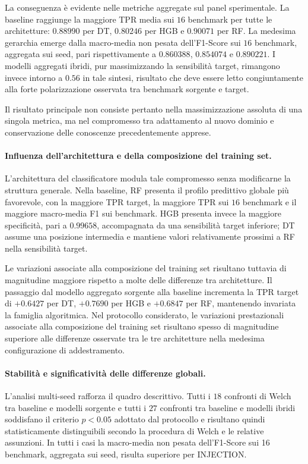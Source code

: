 La conseguenza è evidente nelle metriche aggregate sul panel sperimentale. 
La baseline raggiunge la maggiore TPR media sui $16$ benchmark per tutte le architetture: $0.88990$ per DT, $0.80246$ per HGB e $0.90071$ per RF. 
La medesima gerarchia emerge dalla macro-media non pesata dell'F1-Score sui $16$ benchmark, aggregata sui seed, pari rispettivamente a $0.860388$, $0.854074$ e $0.890221$. 
I modelli aggregati ibridi, pur massimizzando la sensibilità target, rimangono invece intorno a $0.56$ in tale sintesi, risultato che deve essere letto congiuntamente alla forte polarizzazione osservata tra benchmark sorgente e target.

Il risultato principale non consiste pertanto nella massimizzazione assoluta di una singola metrica, ma nel compromesso tra adattamento al nuovo dominio e conservazione delle conoscenze precedentemente apprese.

\paragraph{Influenza dell'architettura e della composizione del training set.}
L'architettura del classificatore modula tale compromesso senza modificarne la struttura generale. 
Nella baseline, RF presenta il profilo predittivo globale più favorevole, con la maggiore TPR target, la maggiore TPR sui $16$ benchmark e il maggiore macro-media F1 sui benchmark. 
HGB presenta invece la maggiore specificità, pari a $0.99658$, accompagnata da una sensibilità target inferiore; DT assume una posizione intermedia e mantiene valori relativamente prossimi a RF nella sensibilità target.

Le variazioni associate alla composizione del training set risultano tuttavia di magnitudine maggiore rispetto a molte delle differenze tra architetture.
Il passaggio dal modello aggregato sorgente alla baseline incrementa la TPR target di $+0.6427$ per DT, $+0.7690$ per HGB e $+0.6847$ per RF, mantenendo invariata la famiglia algoritmica. 
Nel protocollo considerato, le variazioni prestazionali associate alla composizione del training set risultano spesso di magnitudine superiore alle differenze osservate tra le tre architetture nella medesima configurazione di addestramento.

\paragraph{Stabilità e significatività delle differenze globali.}
L'analisi multi-seed rafforza il quadro descrittivo. 
Tutti i $18$ confronti di Welch tra baseline e modelli sorgente e tutti i $27$ confronti tra baseline e modelli ibridi soddisfano il criterio $p<0.05$ adottato dal protocollo e risultano quindi statisticamente distinguibili secondo la procedura di Welch e le relative assunzioni. 
In tutti i casi la macro-media non pesata dell'F1-Score sui 16 benchmark, aggregata sui seed, risulta superiore per INJECTION.

